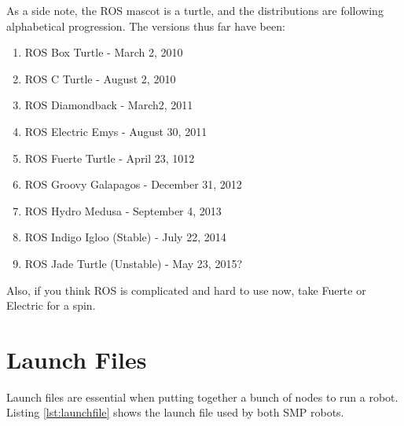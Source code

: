 As a side note, the ROS mascot is a turtle, and the distributions are following alphabetical progression. The versions thus far have been:

\begin{enumerate}
\item{ROS Box Turtle - March 2, 2010}
\item{ROS C Turtle - August 2, 2010}
\item{ROS Diamondback - March2, 2011}
\item{ROS Electric Emys - August 30, 2011}
\item{ROS Fuerte Turtle - April 23, 1012}
\item{ROS Groovy Galapagos - December 31, 2012}
\item{ROS Hydro Medusa - September 4, 2013}
\item{ROS Indigo Igloo (Stable) - July 22, 2014}
\item{ROS Jade Turtle (Unstable) - May 23, 2015?}
\end{enumerate}

Also, if you think ROS is complicated and hard to use now, take Fuerte or Electric for a spin.

\section{Launch Files}
\label{sec:launchfiles}

Launch files are essential when putting together a bunch of nodes to run a robot. Listing \ref{lst:launchfile} shows the launch file used by both SMP robots.

